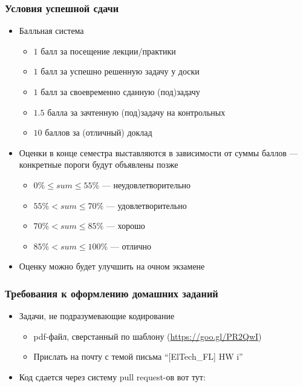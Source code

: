 \documentclass{beamer}
\begin{document}
\begin{frame}[fragile]
  \transwipe[direction=90]
  \frametitle{Условия успешной сдачи}
  \begin{itemize}
    \item Балльная система
    \begin{itemize}
      \item $1$ балл за посещение лекции/практики
      \item $1$ балл за успешно решенную задачу у доски 
      \item $1$ балл за своевременно сданную (под)задачу
      \item $1.5$ балла за зачтенную (под)задачу на контрольных
      \item $10$ баллов за (отличный) доклад
    \end{itemize}
    \item Оценки в конце семестра выставляются в зависимости от суммы баллов 
--- конкретные пороги будут объявлены позже
    \pause
    \begin{itemize}
      \item $0  \% \le sum \le 55 \%$ --- неудовлетворительно
      \item $55 \% < sum \le 70 \%$ --- удовлетворительно
      \item $70 \% < sum \le 85 \%$ --- хорошо
      \item $85 \% < sum \le 100 \%$ --- отлично
    \end{itemize}
  \end{itemize}
  \begin{itemize}
    \item Оценку можно будет улучшить на очном экзамене
  \end{itemize}
\end{frame}

\begin{frame}[fragile]
  \transwipe[direction=90]
  \frametitle{Требования к оформлению домашних заданий}
  \begin{itemize}
    \item Задачи, не подразумевающие кодирование
    \begin{itemize}
      \item pdf-файл, сверстанный по 
шаблону (\href{https://goo.gl/PR2QwI}{https://goo.gl/PR2QwI})
      \item Прислать на почту с темой письма ``[ElTech\_FL] HW i''
    \end{itemize}
    \item Код сдается через систему pull request-ов вот тут:
  \end{itemize}
\end{frame}
\end{document}
